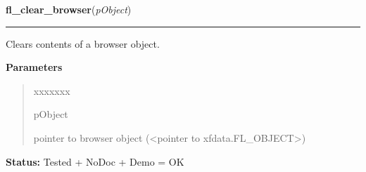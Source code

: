     \label{xformslib:library:fl_clear_browser}

    \vspace{0.5ex}

\hspace{.8\funcindent}\begin{boxedminipage}{\funcwidth}

    \raggedright \textbf{fl\_clear\_browser}(\textit{pObject})

    \vspace{-1.5ex}

    \rule{\textwidth}{0.5\fboxrule}
\setlength{\parskip}{2ex}
    Clears contents of a browser object.

\setlength{\parskip}{1ex}
      \textbf{Parameters}
      \vspace{-1ex}

      \begin{quote}
        \begin{Ventry}{xxxxxxx}

          \item[pObject]

          pointer to browser object ({\textless}pointer to 
          xfdata.FL\_OBJECT{\textgreater})

        \end{Ventry}

      \end{quote}

\textbf{Status:} Tested + NoDoc + Demo = OK



    \end{boxedminipage}

    \label{xformslib:library:fl_add_browser_line}

    \vspace{0.5ex}

